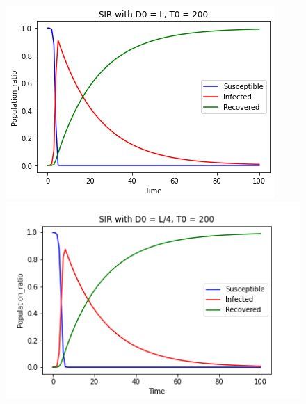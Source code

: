 \documentclass[12pt, reqno]{amsart}
\begin{document}
    \begin{figure}[h]
        \centering
        \begin{minipage}[b]{0.4 \textwidth}
            \includegraphics[width=\textwidth]{./discrete/sir_discrete_grid0.png}
            \caption{}
            \label{fig:d=l}
        \end{minipage}
        \hfill
        \begin{minipage}[b]{0.45 \textwidth}
            \includegraphics[width=\textwidth]{./discrete/sir_discrete_grid1.png}
            \caption{}
            \label{fig:d=l/4}
        \end{minipage}
        \centering
        \begin{minipage}[b]{0.45 \textwidth}

\end{minipage}
\end{figure}
\end{document}
